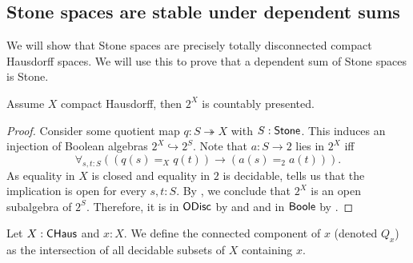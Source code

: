 \subsection{Stone spaces are stable under dependent sums}
We will show that Stone spaces are precisely totally disconnected compact Hausdorff spaces. 
We will use this to prove that a dependent sum of Stone spaces is Stone.

\begin{lemma}\label{AlgebraCompactHausdorffCountablyPresented}
Assume $X$ compact Hausdorff, then $2^X$ is countably presented.
\end{lemma}

\begin{proof}
  Consider some quotient map $q:S\twoheadrightarrow X$ with $S:\mathsf{Stone}$. 
%
  This induces an injection of Boolean algebras $2^X \hookrightarrow 2^S$.
  Note that $a:S\to 2$ lies in $2^X$ iff %
  $$\forall_{s,t:S}\left(\left(q(s) =_X q(t)\right) \to \left(a(s) =_2a(t)\right)\right).$$
  As equality in $X$ is closed and equality in $2$ is decidable, 
  tells us that the implication is open for every $s,t:S$. 
  By , we conclude that 
  $2^X$ is an open subalgebra of $2^S$. 
  Therefore, it is in $\mathsf{ODisc}$ by
   and  
  and in $\mathsf{Boole}$ by .
%
%
%
\end{proof}
\begin{definition}
  Let $X:\mathsf{CHaus}$ and $x:X$. 
  We define the connected component of $x$ (denoted $Q_x$)
  as the intersection of all decidable subsets of $X$ containing $x$. 
\end{definition}


